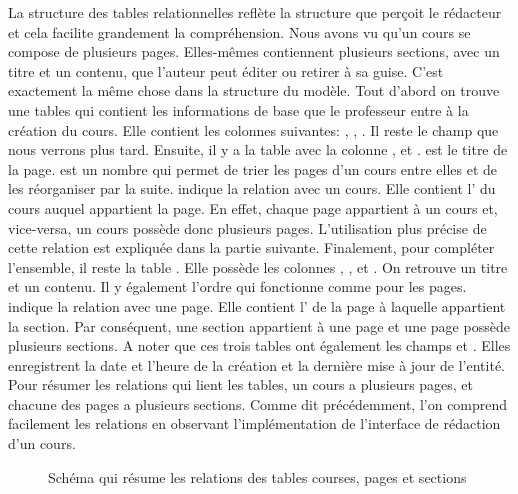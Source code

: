 \documentclass[a4paper,10pt,twoside]{sphinxmanual}
\begin{document}
La structure des tables relationnelles reflète la structure que perçoit le rédacteur et cela facilite grandement la compréhension. Nous avons vu qu'un cours se compose de plusieurs pages. Elles-mêmes contiennent plusieurs sections, avec un titre et un contenu, que l'auteur peut éditer ou retirer à sa guise. C'est exactement la même chose dans la structure du modèle. Tout d'abord on trouve une tables  qui contient les informations de base que le professeur entre à la création du cours. Elle contient les colonnes suivantes: , , . Il reste le champ  que nous verrons plus tard. Ensuite, il y a la table  avec la colonne ,  et .  est le titre de la page.  est un nombre qui permet de trier les pages d'un cours entre elles et de les réorganiser par la suite.  indique la relation avec un cours. Elle contient l' du cours auquel appartient la page. En effet, chaque page appartient à un cours et, vice-versa, un cours possède donc plusieurs pages. L'utilisation plus précise de cette relation est expliquée dans la partie suivante. Finalement, pour compléter l'ensemble, il reste la table . Elle possède les colonnes , ,  et . On retrouve un titre et un contenu. Il y également l'ordre qui fonctionne comme pour les pages.  indique la relation avec une page. Elle contient l' de la page à laquelle appartient la section. Par conséquent, une section appartient à une page et une page possède plusieurs sections. A noter que ces trois tables ont également les champs  et . Elles enregistrent la date et l'heure de la création et la dernière mise à jour de l'entité. Pour résumer les relations qui lient les tables, un cours a plusieurs pages, et chacune des pages a plusieurs sections. Comme dit précédemment, l'on comprend facilement les relations en observant l'implémentation de l'interface de rédaction d'un cours.
\begin{figure}[htbp]
\centering
\capstart

\caption{Schéma qui résume les relations des tables courses, pages et sections}\end{figure}
\end{document}
